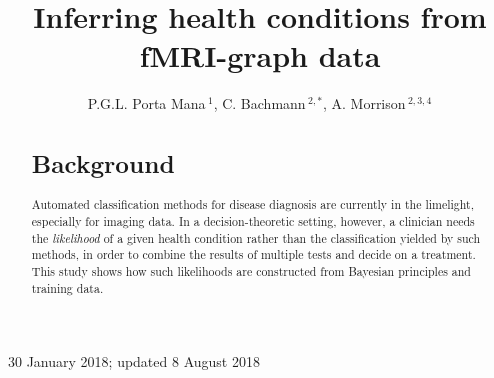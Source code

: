 \documentclass[%
]{frontiersSCNS-nologo} %
\newcommand*{\oggi}{8 August 2018}
\newcommand*{\propertitle}{Inferring health conditions from fMRI-graph data}
\newcommand*{\headtitle}{Health conditions from fMRI data}
\renewcommand*{\|}{\mathpunct{|}}%
\def\firstAuthorLast{Porta Mana, Bachmann, Morrison}%
\def\Authors{ P.G.L. Porta Mana\,$^{1}$, C. Bachmann\,$^{2,*}$, A. Morrison\,$^{2,3,4}$}
\begin{document}
\onecolumn
{}

\title[\headtitle]{\propertitle} 

\author[\firstAuthorLast ]{\Authors} 
\address{} 
\correspondance{} 

\extraAuth{}


\maketitle
\vspace{-2\medskipamount}
{30 January 2018; updated \oggi}
\medskip

\begin{abstract}

\section{Background}

Automated classification methods for disease diagnosis are currently in the
limelight, especially for imaging data. In a decision-theoretic setting,
however, a clinician needs the \emph{likelihood} of a given health condition
rather than the classification yielded by such methods, in order to combine
the results of multiple tests and decide on a treatment. This study shows
how such likelihoods are constructed from Bayesian principles and training
data.


\end{abstract}
\end{document}
